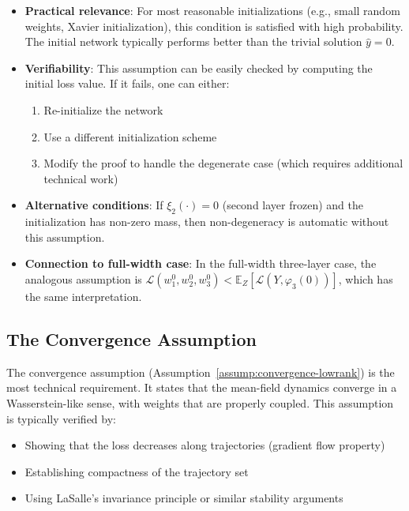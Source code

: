 \documentclass[11pt]{article}
\newcommand{\E}{\mathbb{E}}
\newcommand{\1}{\mathbbm{1}}
\begin{document}
\begin{itemize}
\item \textbf{Practical relevance}: For most reasonable initializations (e.g., small random weights, Xavier initialization), this condition is satisfied with high probability. The initial network typically performs better than the trivial solution $\hat y=0$.

\item \textbf{Verifiability}: This assumption can be easily checked by computing the initial loss value. If it fails, one can either:
\begin{enumerate}
\item Re-initialize the network
\item Use a different initialization scheme
\item Modify the proof to handle the degenerate case (which requires additional technical work)
\end{enumerate}

\item \textbf{Alternative conditions}: If $\xi_2(\cdot)=0$ (second layer frozen) and the initialization has non-zero mass, then non-degeneracy is automatic without this assumption.

\item \textbf{Connection to full-width case}: In the full-width three-layer case, the analogous assumption is $\mathscr{L}(w_1^0,w_2^0,w_3^0) < \E_Z[\mathcal{L}(Y,\varphi_3(0))]$, which has the same interpretation.
\end{itemize}

\subsection{The Convergence Assumption}

The convergence assumption (Assumption~\ref{assump:convergence-lowrank}) is the most technical requirement. It states that the mean-field dynamics converge in a Wasserstein-like sense, with weights that are properly coupled. This assumption is typically verified by:
\begin{itemize}
\item Showing that the loss decreases along trajectories (gradient flow property)
\item Establishing compactness of the trajectory set
\item Using LaSalle's invariance principle or similar stability arguments
\end{itemize}
\end{document}
